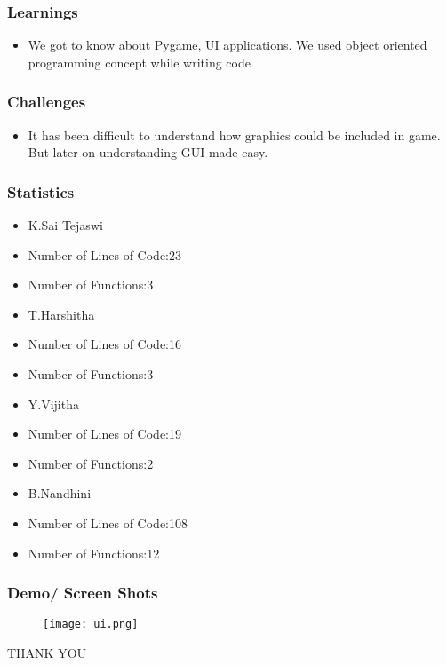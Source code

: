 \documentclass[12pt]{beamer}
\begin{document}
    \begin{frame}
        \frametitle{Learnings}
	\begin{itemize}
	    \item We got to know about Pygame, UI applications. We used object oriented programming concept while writing code
	\end{itemize}
    \end{frame}
    \begin{frame}
	\frametitle{Challenges}
        \begin{itemize}
	    \item It has been difficult to understand how graphics could be included in game. But later on
	    understanding GUI made easy.
        \end{itemize}
    \end{frame}
    \begin{frame}
	\frametitle{Statistics}
        \begin{itemize}
        \item K.Sai Tejaswi\\
	     \item Number of Lines of Code:23\\
	     \item Number of Functions:3\\
	     \item T.Harshitha\\
	     \item Number of Lines of Code:16\\
	     \item Number of Functions:3\\
	     \item Y.Vijitha\\
	     \item Number of Lines of Code:19\\
	     \item Number of Functions:2\\
	     \item B.Nandhini\\
	     \item Number of Lines of Code:108\\
	     \item Number of Functions:12\\
	     
        \end{itemize}
    \end{frame}
    \begin{frame}
	\frametitle{Demo/ Screen Shots}
	\begin{figure}
\texttt{[image: ui.png]}
\end{figure}
    \end{frame}
    \begin{frame}
	\begin{center}
	      THANK YOU
	\end{center}
    \end{frame}
\end{document}
